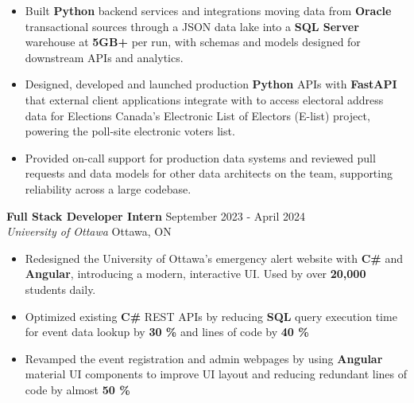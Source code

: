 \documentclass[a4paper]{article}
\begin{document}
\begin{itemize}
\item Built \textbf{Python} backend services and integrations moving data from \textbf{Oracle} transactional sources through a JSON data lake into a \textbf{SQL Server} warehouse at \textbf{5GB+} per run, with schemas and models designed for downstream APIs and analytics.

\item Designed, developed and launched production \textbf{Python} APIs with \textbf{FastAPI} that external client applications integrate with to access electoral address data for Elections Canada's Electronic List of Electors (E-list) project, powering the poll-site electronic voters list.

\item Provided on-call support for production data systems and reviewed pull requests and data models for other data architects on the team, supporting reliability across a large codebase.

\end{itemize}

\textbf{Full Stack Developer Intern } \hfill September 2023 - April 2024\\
\textit{University of Ottawa} \hfill Ottawa, ON\\
\vspace{-2mm}
\begin{itemize} \itemsep -4pt
    \item Redesigned the University of Ottawa's emergency alert website with \textbf{C\#} and \textbf{Angular}, introducing a modern, interactive UI. Used by over \textbf{20,000} students daily.
     \item Optimized existing \textbf{C\#} REST APIs by reducing \textbf{SQL} query execution time for event data lookup by \textbf{30 \%} and lines of code by \textbf{40 \%}
    \item Revamped the event registration and admin webpages by using \textbf{Angular} material UI components to improve UI layout and reducing redundant lines of code by almost \textbf{50 \%}
\end{itemize}
\end{document}
